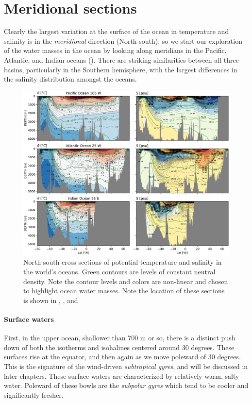 \section{Meridional sections}

Clearly the largest variation at the surface of the ocean in temperature and salinity is in the \emph{meridional} direction (North-south), so we start our exploration of the water masses in the ocean by looking along meridians in the Pacific, Atlantic, and Indian oceans ().  There are striking similarities between all three basins, particularly in the Southern hemisphere, with the largest differences in the salinity distribution amongst the oceans.  

\begin{figure}
  \centering
  \includegraphics[width=7in]{figs/WaterMasses/AllTSSection}
    \caption{North-south cross sections of potential temperature and salinity in the world's oceans.  Green contours are levels of constant neutral density.  Note the contour levels and colors are non-linear and chosen to highlight ocean water masses. Note the location of these sections is shown in , , and  }
    \label{fig:AllTSSection}  
\end{figure}

\paragraph{Surface waters}
First, in the upper ocean, shallower than 700 m or so, there is a distinct push down of both the isotherms and isohalines centered around 30 degrees.  These surfaces rise at the equator, and then again as we move poleward of 30 degrees.  This is the signature of the wind-driven \emph{subtropical gyres}, and will be discussed in later chapters.  These surface waters are characterized by relatively warm, salty water.  Poleward of these bowls are the \emph{subpolar gyres} which tend to be cooler and significantly fresher.  

